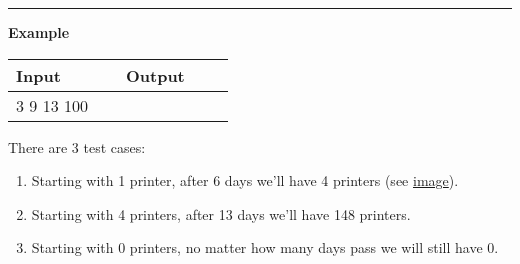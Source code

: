 \vspace{8pt}
\hrule

\textbf{Example}

\begin{table}[h]
    \centering
    \begin{tabular}{|p{0.4\linewidth}|p{0.4\linewidth}|}
        \hline
        Input & Output \\
        \hline
        3 \newline 1 9 \newline 4 13 \newline 0 100 & 
        \text{} \newline 12 \newline 148 \newline 0 \\
        \hline
    \end{tabular}
\end{table}

There are 3 test cases:

\begin{enumerate}
    \item Starting with 1 printer, after 6 days we'll have 4 printers (see \href{https://uwcs.co.uk/media/images/firefox_XuzeaIzMRs.original.png}{image}).
    \item Starting with 4 printers, after 13 days we'll have 148 printers.
    \item Starting with 0 printers, no matter how many days pass we will still have 0.
\end{enumerate}